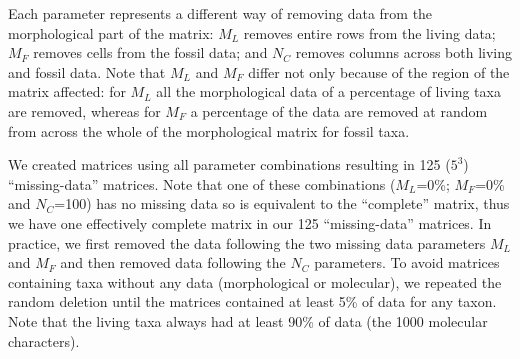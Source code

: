 Each parameter represents a different way of removing data from the morphological part of the matrix: $M_L$ removes entire rows from the living data; $M_F$ removes cells from the fossil data; and $N_C$ removes columns across both living and fossil data.
Note that $M_L$ and $M_F$ differ not only because of the region of the matrix affected: for $M_L$ all the morphological data of a percentage of living taxa are removed, whereas for $M_F$ a percentage of the data are removed at random from across the whole of the morphological matrix for fossil taxa.

We created matrices using all parameter combinations resulting in 125 ($5^3$) ``missing-data'' matrices.
Note that one of these combinations ($M_L$=0\%; $M_F$=0\% and $N_C$=100) has no missing data so is equivalent to the ``complete'' matrix, thus we have one effectively complete matrix in our 125 ``missing-data'' matrices.
In practice, we first removed the data following the two missing data parameters $M_L$ and $M_F$ and then removed data following the $N_C$ parameters.
To avoid matrices containing taxa without any data (morphological or molecular), we repeated the random deletion until the matrices contained at least 5\% of data for any taxon.
Note that the living taxa always had at least 90\% of data (the 1000 molecular characters).



